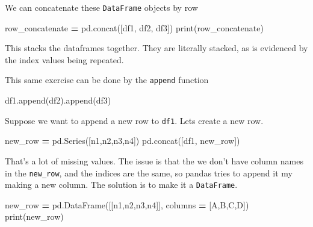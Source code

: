 \documentclass[
  letterpaper,
]{scrbook}
\newenvironment{Shaded}{\begin{snugshade}}{\end{snugshade}}
\newcommand{\BuiltInTok}[1]{#1}
\newcommand{\NormalTok}[1]{#1}
\newcommand{\OperatorTok}[1]{\textcolor[rgb]{0.81,0.36,0.00}{\textbf{#1}}}
\newcommand{\StringTok}[1]{\textcolor[rgb]{0.31,0.60,0.02}{#1}}
\begin{document}
We can concatenate these \texttt{DataFrame} objects by row

\begin{Shaded}
\begin{Highlighting}[]
\NormalTok{row\_concatenate }\OperatorTok{=}\NormalTok{ pd.concat([df1, df2, df3])}
\BuiltInTok{print}\NormalTok{(row\_concatenate)}
\end{Highlighting}
\end{Shaded}

This stacks the dataframes together. They are literally stacked, as is evidenced by the index values being repeated.

This same exercise can be done by the \texttt{append} function

\begin{Shaded}
\begin{Highlighting}[]
\NormalTok{df1.append(df2).append(df3)}
\end{Highlighting}
\end{Shaded}

Suppose we want to append a new row to \texttt{df1}. Lets create a new row.

\begin{Shaded}
\begin{Highlighting}[]
\NormalTok{new\_row }\OperatorTok{=}\NormalTok{ pd.Series([}\StringTok{\textquotesingle{}n1\textquotesingle{}}\NormalTok{,}\StringTok{\textquotesingle{}n2\textquotesingle{}}\NormalTok{,}\StringTok{\textquotesingle{}n3\textquotesingle{}}\NormalTok{,}\StringTok{\textquotesingle{}n4\textquotesingle{}}\NormalTok{])}
\NormalTok{pd.concat([df1, new\_row])}
\end{Highlighting}
\end{Shaded}

That's a lot of missing values. The issue is that the we don't have column names in the \texttt{new\_row}, and the indices are the same, so pandas tries to append it my making a new column. The solution is to make it a \texttt{DataFrame}.

\begin{Shaded}
\begin{Highlighting}[]
\NormalTok{new\_row }\OperatorTok{=}\NormalTok{ pd.DataFrame([[}\StringTok{\textquotesingle{}n1\textquotesingle{}}\NormalTok{,}\StringTok{\textquotesingle{}n2\textquotesingle{}}\NormalTok{,}\StringTok{\textquotesingle{}n3\textquotesingle{}}\NormalTok{,}\StringTok{\textquotesingle{}n4\textquotesingle{}}\NormalTok{]], columns }\OperatorTok{=}\NormalTok{ [}\StringTok{\textquotesingle{}A\textquotesingle{}}\NormalTok{,}\StringTok{\textquotesingle{}B\textquotesingle{}}\NormalTok{,}\StringTok{\textquotesingle{}C\textquotesingle{}}\NormalTok{,}\StringTok{\textquotesingle{}D\textquotesingle{}}\NormalTok{])}
\BuiltInTok{print}\NormalTok{(new\_row)}
\end{Highlighting}
\end{Shaded}
\end{document}
